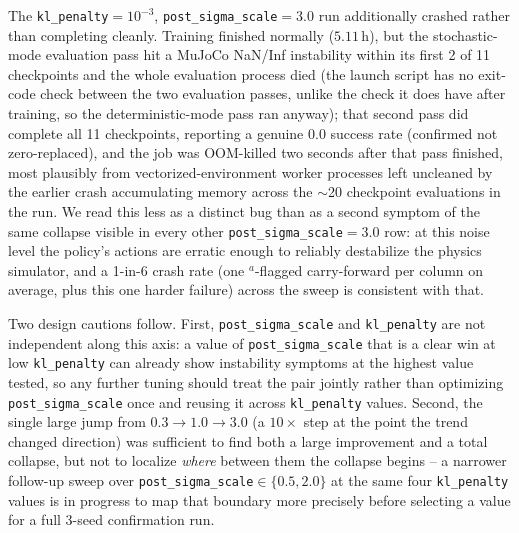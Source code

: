 \documentclass[11pt]{article}
\begin{document}
The \texttt{kl\_penalty}$=10^{-3}$, \texttt{post\_sigma\_scale}$=3.0$ run
additionally crashed rather than completing cleanly. Training finished
normally ($5.11\,\mathrm{h}$), but the stochastic-mode evaluation pass hit a
MuJoCo NaN/Inf instability within its first 2 of 11 checkpoints and the whole
evaluation process died (the launch script has no exit-code check between the
two evaluation passes, unlike the check it does have after training, so the
deterministic-mode pass ran anyway); that second pass did complete all 11
checkpoints, reporting a genuine $0.0$ success rate (confirmed not
zero-replaced), and the job was OOM-killed two seconds after that pass
finished, most plausibly from vectorized-environment worker processes left
uncleaned by the earlier crash accumulating memory across the
$\sim$20 checkpoint evaluations in the run. We read this less as a distinct
bug than as a second symptom of the same collapse visible in every other
\texttt{post\_sigma\_scale}$=3.0$ row: at this noise level the policy's
actions are erratic enough to reliably destabilize the physics simulator,
and a 1-in-6 crash rate (one $^{a}$-flagged carry-forward per column on
average, plus this one harder failure) across the sweep is consistent with
that.

Two design cautions follow. First, \texttt{post\_sigma\_scale} and
\texttt{kl\_penalty} are not independent along this axis: a value of
\texttt{post\_sigma\_scale} that is a clear win at low \texttt{kl\_penalty}
can already show instability symptoms at the highest value tested, so any
further tuning should treat the pair jointly rather than optimizing
\texttt{post\_sigma\_scale} once and reusing it across \texttt{kl\_penalty}
values. Second, the single large jump from $0.3\to1.0\to3.0$ (a
$10\times$ step at the point the trend changed direction) was sufficient to
find both a large improvement and a total collapse, but not to localize
\emph{where} between them the collapse begins -- a narrower follow-up sweep
over \texttt{post\_sigma\_scale}$\in\{0.5,2.0\}$ at the same four
\texttt{kl\_penalty} values is in progress to map that boundary more
precisely before selecting a value for a full 3-seed confirmation run.
\end{document}
